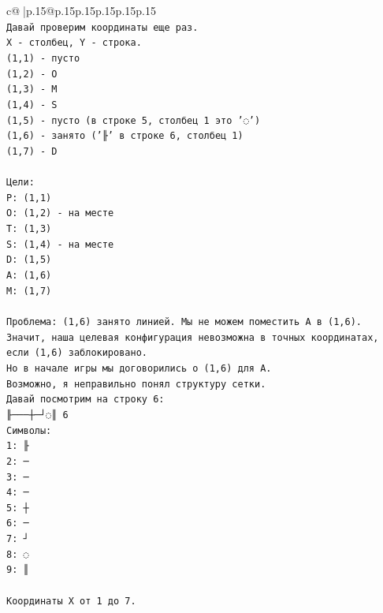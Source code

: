 \documentclass{article}
\begin{document}
{\begin{supertabular}{c@{$\;$}|p{.15\linewidth}@{}p{.15\linewidth}p{.15\linewidth}p{.15\linewidth}p{.15\linewidth}p{.15\linewidth}}
{{{\\ 
\texttt{Давай проверим координаты еще раз.} \\
\texttt{X {-} столбец, Y {-} строка.} \\
\texttt{(1,1) {-} пусто} \\
\texttt{(1,2) {-} O} \\
\texttt{(1,3) {-} M} \\
\texttt{(1,4) {-} S} \\
\texttt{(1,5) {-} пусто (в строке 5, столбец 1 это '◌')} \\
\texttt{(1,6) {-} занято ('╟' в строке 6, столбец 1)} \\
\texttt{(1,7) {-} D} \\
\\ 
\texttt{Цели:} \\
\texttt{P: (1,1)} \\
\texttt{O: (1,2) {-} на месте} \\
\texttt{T: (1,3)} \\
\texttt{S: (1,4) {-} на месте} \\
\texttt{D: (1,5)} \\
\texttt{A: (1,6)} \\
\texttt{M: (1,7)} \\
\\ 
\texttt{Проблема: (1,6) занято линией. Мы не можем поместить A в (1,6).} \\
\texttt{Значит, наша целевая конфигурация невозможна в точных координатах, если (1,6) заблокировано.} \\
\texttt{Но в начале игры мы договорились о (1,6) для A.} \\
\texttt{Возможно, я неправильно понял структуру сетки.} \\
\texttt{Давай посмотрим на строку 6:} \\
\texttt{╟───┼─┘◌║ 6} \\
\texttt{Символы:} \\
\texttt{1: ╟} \\
\texttt{2: ─} \\
\texttt{3: ─} \\
\texttt{4: ─} \\
\texttt{5: ┼} \\
\texttt{6: ─} \\
\texttt{7: ┘} \\
\texttt{8: ◌} \\
\texttt{9: ║} \\
\\ 
\texttt{Координаты X от 1 до 7.} \\
}}}
\end{supertabular}}
\end{document}
